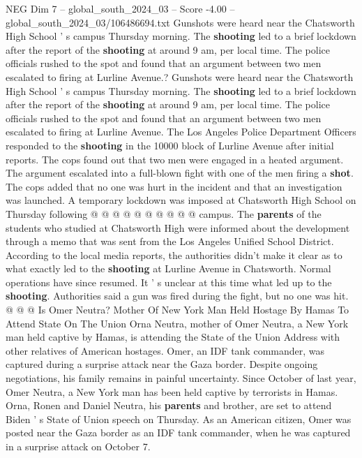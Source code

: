 \begin{textsample}{NEG Dim 7 – global\_south\_2024\_03 – Score -4.00 – global\_south\_2024\_03/106486694.txt}  \label{ex:f7_neg_427}
Gunshots were heard near the Chatsworth High School ' s campus Thursday morning.
The \textbf{shooting} led to a brief lockdown after the report of the \textbf{shooting} at around 9 am, per local time.
The police officials rushed to the spot and found that an argument between two men escalated to firing at Lurline Avenue.?
Gunshots were heard near the Chatsworth High School ' s campus Thursday morning.
The \textbf{shooting} led to a brief lockdown after the report of the \textbf{shooting} at around 9 am, per local time.
The police officials rushed to the spot and found that an argument between two men escalated to firing at Lurline Avenue.
The Los Angeles Police Department Officers responded to the \textbf{shooting} in the 10000 block of Lurline Avenue after initial reports.
The cops found out that two men were engaged in a heated argument.
The argument escalated into a full-blown fight with one of the men firing a \textbf{shot}.
The cops added that no one was hurt in the incident and that an investigation was launched.
A temporary lockdown was imposed at Chatsworth High School on Thursday following @ @ @ @ @ @ @ @ @ @ campus.
The \textbf{parents} of the students who studied at Chatsworth High were informed about the development through a memo that was sent from the Los Angeles Unified School District.
According to the local media reports, the authorities didn't make it clear as to what exactly led to the \textbf{shooting} at Lurline Avenue in Chatsworth.
Normal operations have since resumed.
It ' s unclear at this time what led up to the \textbf{shooting}.
Authorities said a gun was fired during the fight, but no one was hit. @ @ @ Is Omer Neutra?
Mother Of New York Man Held Hostage By Hamas To Attend State On The Union Orna Neutra, mother of Omer Neutra, a New York man held captive by Hamas, is attending the State of the Union Address with other relatives of American hostages.
Omer, an IDF tank commander, was captured during a surprise attack near the Gaza border.
Despite ongoing negotiations, his family remains in painful uncertainty.
Since October of last year, Omer Neutra, a New York man has been held captive by terrorists in Hamas.
Orna, Ronen and Daniel Neutra, his \textbf{parents} and brother, are set to attend Biden ' s State of Union speech on Thursday.
As an American citizen, Omer was posted near the Gaza border as an IDF tank commander, when he was captured in a surprise attack on October 7.

\end{textsample}
